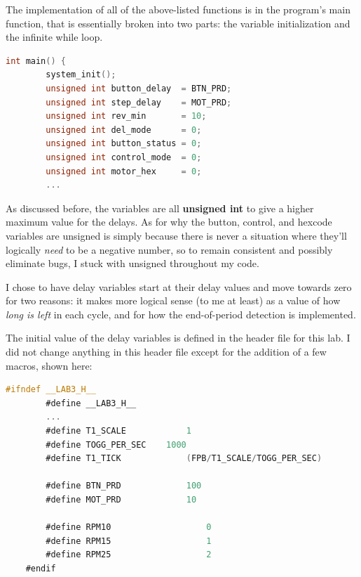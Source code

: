 \documentclass[a4paper, 12pt]{article}
\begin{document}
The implementation of all of the above-listed functions is in the program's main function, that is essentially broken into two parts: the variable initialization and the infinite while loop.

	\begin{mdframed}[backgroundcolor=code-gray, roundcorner=10pt,
								innerleftmargin=5, innertopmargin=5, innerbottommargin=5]	
	\begin{lstlisting}[language=C, caption=Main Variable Initialization, tabsize=2]
	int main() {
		system_init();
		unsigned int button_delay  = BTN_PRD;
		unsigned int step_delay    = MOT_PRD;
		unsigned int rev_min       = 10;
		unsigned int del_mode      = 0;
		unsigned int button_status = 0;
		unsigned int control_mode  = 0;
		unsigned int motor_hex     = 0;
		...
	\end{lstlisting}
	\end{mdframed}
	
As discussed before, the variables are all \textbf{unsigned int} to give a higher maximum value for the delays. As for why the button, control, and hexcode variables are unsigned is simply because there is never a situation where they'll logically \textit{need} to be a negative number, so to remain consistent and possibly eliminate bugs, I stuck with unsigned throughout my code.

I chose to have delay variables start at their delay values and move towards zero for two reasons: it makes more logical sense (to me at least) as a value of how \textit{long is left} in each cycle, and for how the end-of-period detection is implemented.

The initial value of the delay variables is defined in the header file for this lab. I did not change anything in this header file except for the addition of a few macros, shown here:

	\begin{mdframed}[backgroundcolor=code-gray, roundcorner=10pt,
								innerleftmargin=5, innertopmargin=5, innerbottommargin=5]	
	\begin{lstlisting}[language=C, caption=Header File Macros, tabsize=2]
	#ifndef __LAB3_H__
		#define __LAB3_H__
		...
		#define T1_SCALE			1
		#define TOGG_PER_SEC	1000
		#define T1_TICK				(FPB/T1_SCALE/TOGG_PER_SEC)
		
		#define BTN_PRD				100
		#define MOT_PRD				10

		#define RPM10					0
		#define RPM15					1
		#define RPM25					2
	#endif
	\end{lstlisting}
	\end{mdframed}
	
\end{document}
